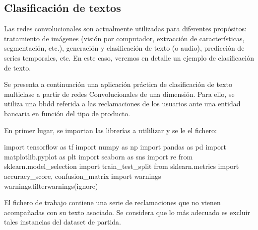 \documentclass[
  a4paper,
  DIV=11,
  numbers=noendperiod]{scrreprt}
\newenvironment{Shaded}{\begin{snugshade}}{\end{snugshade}}
\newcommand{\ImportTok}[1]{#1}
\newcommand{\NormalTok}[1]{#1}
\newcommand{\StringTok}[1]{\textcolor[rgb]{0.31,0.60,0.02}{#1}}
\begin{document}
\begin{Shaded}
\begin{Highlighting}[numbers=left,,]
\end{Highlighting}
\end{Shaded}

\subsection{Clasificación de textos}\label{clasificaciuxf3n-de-textos}

Las redes convolucionales son actualmente utilizadas para diferentes
propósitos: tratamiento de imágenes (visión por computador, extracción
de características, segmentación, etc.), generación y clasificación de
texto (o audio), predicción de series temporales, etc. En este caso,
veremos en detalle un ejemplo de clasificación de texto.

Se presenta a continuación una aplicación práctica de clasificación de
texto multiclase a partir de redes Convolucionales de una dimensión.
Para ello, se utiliza una bbdd referida a las reclamaciones de los
usuarios ante una entidad bancaria en función del tipo de producto.

En primer lugar, se importan las librerías a utililizar y se le el
fichero:

\begin{Shaded}
\begin{Highlighting}[numbers=left,,]
\ImportTok{import}\NormalTok{ tensorflow }\ImportTok{as}\NormalTok{ tf}
\ImportTok{import}\NormalTok{ numpy }\ImportTok{as}\NormalTok{ np}
\ImportTok{import}\NormalTok{ pandas }\ImportTok{as}\NormalTok{ pd}
\ImportTok{import}\NormalTok{ matplotlib.pyplot }\ImportTok{as}\NormalTok{ plt}
\ImportTok{import}\NormalTok{ seaborn }\ImportTok{as}\NormalTok{ sns}
\ImportTok{import}\NormalTok{ re}
\ImportTok{from}\NormalTok{ sklearn.model\_selection }\ImportTok{import}\NormalTok{ train\_test\_split}
\ImportTok{from}\NormalTok{ sklearn.metrics }\ImportTok{import}\NormalTok{ accuracy\_score, confusion\_matrix}
\ImportTok{import}\NormalTok{ warnings}
\NormalTok{warnings.filterwarnings(}\StringTok{\textquotesingle{}ignore\textquotesingle{}}\NormalTok{)}
\end{Highlighting}
\end{Shaded}

El fichero de trabajo contiene una serie de reclamaciones que no vienen
acompañadas con su texto asociado. Se considera que lo más adecuado es
excluir tales instancias del dataset de partida.
\end{document}
